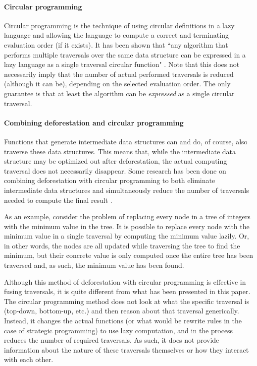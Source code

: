 \paragraph{Circular programming}
Circular programming is the technique of using circular definitions in a lazy language and allowing the language to compute a correct and terminating evaluation order (if it exists). It has been shown that ``any algorithm that performs multiple traversals over the same data structure can be expressed in a lazy language as a single traversal circular function" \autocite{FernandesPS07}. Note that this does not necessarily imply that the number of actual performed traversals is reduced (although it can be), depending on the selected evaluation order. The only guarantee is that at least the algorithm can be \textit{expressed} as a single circular traversal.

\paragraph{Combining deforestation and circular programming}
Functions that generate intermediate data structures can and do, of course, also traverse these data structures. This means that, while the intermediate data structure may be optimized out after deforestation, the actual computing traversal does not necessarily disappear. Some research has been done on combining deforestation with circular programming to both eliminate intermediate data structures and simultaneously reduce the number of traversals needed to compute the final result \autocite{FernandesPS07}.

As an example, consider the problem of replacing every node in a tree of integers with the minimum value in the tree. It is possible to replace every node with the minimum value in a single traversal by computing the minimum value lazily. Or, in other words, the nodes are all updated while traversing the tree to find the minimum, but their concrete value is only computed once the entire tree has been traversed and, as such, the minimum value has been found.

Although this method of deforestation with circular programming is effective in fusing traversals, it is quite different from what has been presented in this paper. The circular programming method does not look at what the specific traversal is (top-down, bottom-up, etc.) and then reason about that traversal generically. Instead, it changes the actual functions (or what would be rewrite rules in the case of strategic programming) to use lazy computation, and in the process reduces the number of required traversals. As such, it does not provide information about the nature of these traversals themselves or how they interact with each other.

